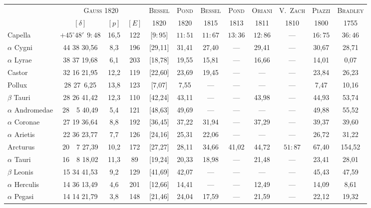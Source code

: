 \documentclass[12pt,a4paper]{article}
\theoremstyle{plain}
\theoremstyle{definition}
\theoremstyle{remark}
\begin{document}
\medskip
{\small
\begin{center}
\begin{tabular}{l|c c c | c c c c c c c c}
\toprule
& \multicolumn{3}{c|}{\textsc{Gauss} 1820} & \textsc{Bessel} & \textsc{Pond} & \textsc{Bessel} & \textsc{Pond} & \textsc{Oriani} & \textsc{V.\ Zach} & \textsc{Piazzi} & \textsc{Bradley} \\
& $[\delta]$ & $[p]$ & $[E]$ & 1820 & 1820 & 1815 & 1813 & 1811 & 1810 & 1800 & 1755 \\
\midrule
Capella & $+45^\circ 48'\ \ 9\!\!:\!\!48$ & 16,5 & 122 & [$9\!\!:\!\!95$] & $11\!\!:\!\!51$ & $11\!\!:\!\!67$ & $13\!\!:\!\!36$ & $12\!\!:\!\!86$ & --- & $16\!\!:\!\!75$ & $36\!\!:\!\!46$ \\
$\alpha$ Cygni & 44 38 30,56 & 8,3 & 196 & [29,11] & 31,41 & 27,40 & --- & 29,41 & --- & 30,67 & 28,71 \\
$\alpha$ Lyrae & 38 37 19,68 & 6,1 & 203 & [18,78] & 19,55 & 15,81 & --- & 16,66 & --- & 14,01 & 0,07 \\
Castor & 32 16 21,95 & 12,2 & 119 & [22,60] & 23,69 & 19,45 & --- & --- & --- & 23,84 & 26,23 \\
Pollux & 28 27\quad\, 6,25 & 13,8 & 123 & [7,07] & 7,55 & --- & --- & --- & --- & 7,47 & 10,16 \\
\midrule
$\beta$ Tauri & 28 26 41,42 & 12,3 & 110 & [42,24] & 43,11 & --- & --- & 43,98 & --- & 44,93 & 53,74 \\
$\alpha$ Andromedae & 28\ \ 5 40,49 & 5,4 & 121 & [48,63] & 49,69 & --- & --- & --- & --- & 49,88 & 55,52 \\
$\alpha$ Coronae & 27 19 36,64 & 8,8 & 192 & [36,45] & 37,22 & 31,94 & --- & 37,29 & --- & 39,37 & 39,60 \\
$\alpha$ Arietis & 22 36 23,77 & 7,7 & 126 & [24,16] & 25,31 & 22,06 & --- & --- & --- & 26,72 & 31,22 \\
Arcturus & 20\ \ 7 27,39 & 10,2 & 172 & [27,27] & 28,11 & 34,66 & 41,02 & 44,72 & $51\!\!:\!\!87$ & 67,40 & 154,52 \\
\midrule
$\alpha$ Tauri & 16\ \ 8 18,02 & 11,3 & 89 & [19,24] & 20,33 & 18,98 & --- & 21,48 & --- & 23,41 & 28,01 \\
$\beta$ Leonis & 15 34 41,53 & 9,2 & 129 & [41,69] & 42,07 & --- & --- & --- & --- & 45,43 & 47,59 \\
$\alpha$ Herculis & 14 36 13,49 & 4,6 & 201 & [12,66] & 14,41 & --- & --- & 12,49 & --- & 14,09 & 8,61 \\
$\alpha$ Pegasi & 14 14 21,79 & 3,8 & 148 & [21,46] & 24,04 & 17,59 & --- & 21,59 & --- & 22,12 & 19,32 \\

\end{tabular}
\end{center}}
\end{document}
